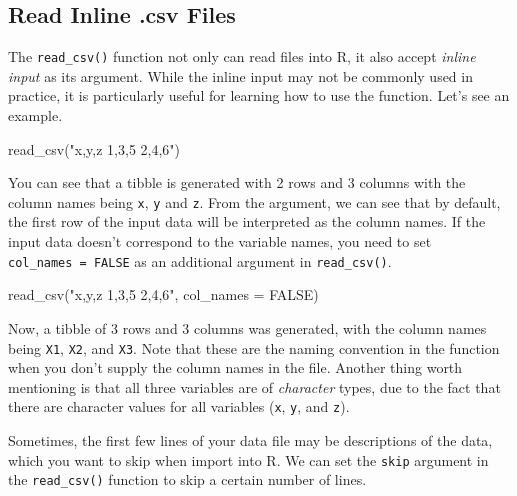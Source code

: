\documentclass[
]{book}
\newenvironment{Shaded}{\begin{snugshade}}{\end{snugshade}}
\newcommand{\AttributeTok}[1]{\textcolor[rgb]{0.77,0.63,0.00}{#1}}
\newcommand{\ConstantTok}[1]{\textcolor[rgb]{0.00,0.00,0.00}{#1}}
\newcommand{\FunctionTok}[1]{\textcolor[rgb]{0.00,0.00,0.00}{#1}}
\newcommand{\NormalTok}[1]{#1}
\newcommand{\StringTok}[1]{\textcolor[rgb]{0.31,0.60,0.02}{#1}}
\begin{document}
\hypertarget{read-inline-.csv-files}{%
\subsection{Read Inline .csv Files}\label{read-inline-.csv-files}}

The \texttt{read\_csv()} function not only can read files into R, it also accept \emph{inline input} as its argument. While the inline input may not be commonly used in practice, it is particularly useful for learning how to use the function. Let's see an example.

\begin{Shaded}
\begin{Highlighting}[]
\FunctionTok{read\_csv}\NormalTok{(}\StringTok{"x,y,z}
\StringTok{          1,3,5}
\StringTok{          2,4,6"}\NormalTok{)}
\end{Highlighting}
\end{Shaded}

You can see that a tibble is generated with 2 rows and 3 columns with the column names being \texttt{x}, \texttt{y} and \texttt{z}. From the argument, we can see that by default, the first row of the input data will be interpreted as the column names. If the input data doesn't correspond to the variable names, you need to set \texttt{col\_names\ =\ FALSE} as an additional argument in \texttt{read\_csv()}.

\begin{Shaded}
\begin{Highlighting}[]
\FunctionTok{read\_csv}\NormalTok{(}\StringTok{"x,y,z}
\StringTok{          1,3,5}
\StringTok{          2,4,6"}\NormalTok{, }\AttributeTok{col\_names =} \ConstantTok{FALSE}\NormalTok{)}
\end{Highlighting}
\end{Shaded}

Now, a tibble of 3 rows and 3 columns was generated, with the column names being \texttt{X1}, \texttt{X2}, and \texttt{X3}. Note that these are the naming convention in the function when you don't supply the column names in the file. Another thing worth mentioning is that all three variables are of \emph{character} types, due to the fact that there are character values for all variables (\texttt{x}, \texttt{y}, and \texttt{z}).

Sometimes, the first few lines of your data file may be descriptions of the data, which you want to skip when import into R. We can set the \texttt{skip} argument in the \texttt{read\_csv()} function to skip a certain number of lines.
\end{document}
